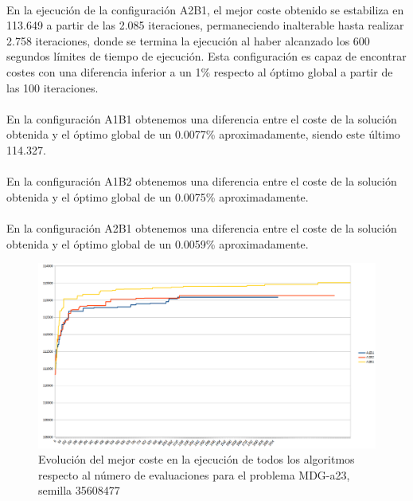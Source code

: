 	\paragraph{}En la ejecución de la configuración A2B1, el mejor coste obtenido se estabiliza en 113.649 a partir de las 2.085 iteraciones, permaneciendo inalterable hasta realizar 2.758 iteraciones, donde se termina la ejecución al haber alcanzado los 600 segundos límites de tiempo de ejecución. Esta configuración es capaz de encontrar costes con una diferencia inferior a un 1\% respecto al óptimo global a partir de las 100 iteraciones.
	
	\paragraph{}En la configuración A1B1 obtenemos una diferencia entre el coste de la solución obtenida y el óptimo global de un 0.0077\% aproximadamente, siendo este último 114.327.
	
	\paragraph{}En la configuración A1B2 obtenemos una diferencia entre el coste de la solución obtenida y el óptimo global de un 0.0075\% aproximadamente.
	
	\paragraph{}En la configuración A2B1 obtenemos una diferencia entre el coste de la solución obtenida y el óptimo global de un 0.0059\% aproximadamente.

	\begin{figure}[H]
		\centering
		\includegraphics[scale=0.3]{img/MDG3conver.png}
		\caption{Evolución del mejor coste en la ejecución de todos los algoritmos respecto al número de evaluaciones para el problema MDG-a23, semilla 35608477}
		\label{MDG-a_23_historico}
	\end{figure}

